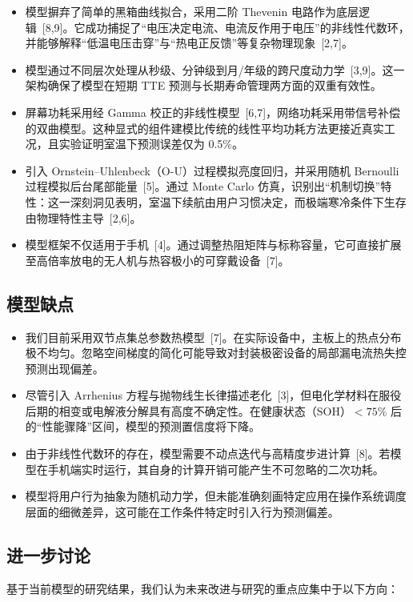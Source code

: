 \documentclass[11pt,a4paper]{ctexart}
\begin{document}
\begin{itemize}
\item 模型摒弃了简单的黑箱曲线拟合，采用二阶 Thevenin 电路作为底层逻辑~[8,9]。它成功捕捉了“电压决定电流、电流反作用于电压”的非线性代数环，并能够解释“低温电压击穿”与“热电正反馈”等复杂物理现象~[2,7]。
\item 模型通过不同层次处理从秒级、分钟级到月/年级的跨尺度动力学~[3,9]。这一架构确保了模型在短期 TTE 预测与长期寿命管理两方面的双重有效性。
\item 屏幕功耗采用经 Gamma 校正的非线性模型~[6,7]，网络功耗采用带信号补偿的双曲模型。这种显式的组件建模比传统的线性平均功耗方法更接近真实工况，且实验证明室温下预测误差仅为 0.5\%。
\item 引入 Ornstein--Uhlenbeck（O-U）过程模拟亮度回归，并采用随机 Bernoulli 过程模拟后台尾部能量~[5]。通过 Monte Carlo 仿真，识别出“机制切换”特性：这一深刻洞见表明，室温下续航由用户习惯决定，而极端寒冷条件下生存由物理特性主导~[2,6]。
\item 模型框架不仅适用于手机~[4]。通过调整热阻矩阵与标称容量，它可直接扩展至高倍率放电的无人机与热容极小的可穿戴设备~[7]。
\end{itemize}

\subsection{模型缺点}

\begin{itemize}
\item 我们目前采用双节点集总参数热模型~[7]。在实际设备中，主板上的热点分布极不均匀。忽略空间梯度的简化可能导致对封装极密设备的局部漏电流热失控预测出现偏差。
\item 尽管引入 Arrhenius 方程与抛物线生长律描述老化~[3]，但电化学材料在服役后期的相变或电解液分解具有高度不确定性。在健康状态（SOH）$<75\%$ 后的“性能骤降”区间，模型的预测置信度将下降。
\item 由于非线性代数环的存在，模型需要不动点迭代与高精度步进计算~[8]。若模型在手机端实时运行，其自身的计算开销可能产生不可忽略的二次功耗。
\item 模型将用户行为抽象为随机动力学，但未能准确刻画特定应用在操作系统调度层面的细微差异，这可能在工作条件特定时引入行为预测偏差。
\end{itemize}

\subsection{进一步讨论}

基于当前模型的研究结果，我们认为未来改进与研究的重点应集中于以下方向：
\end{document}
